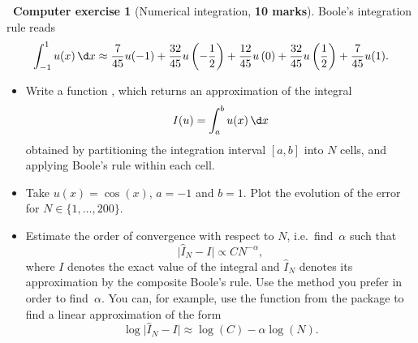 \documentclass[10pt]{article}
\theoremstyle{definition}
\newtheorem{compexercise}{{\normalfont \faLaptop}~Computer exercise}
\theoremstyle{remark}
\begin{document}
\begin{compexercise}
    [Numerical integration, \textbf{10 marks}]
    Boole's integration rule reads
    \[
        \int_{-1}^{1} u(x) \, \d x
        \approx \frac{7}{45} u(-1) + \frac{32}{45} u\left(-\frac{1}{2}\right) + \frac{12}{45} u\left(0\right) + \frac{32}{45} u\left(\frac{1}{2}\right) + \frac{7}{45} u(1).
    \]
    \begin{itemize}
        \item
            Write a function ,
            which returns an approximation of the integral
            \[
                I(u) = \int_{a}^{b} u(x) \, \d x
            \]
            obtained by partitioning the integration interval $[a, b]$ into $N$ cells,
            and applying Boole's rule within each cell.

        \item
            Take $u(x) = \cos(x)$, $a = -1$ and $b = 1$.
            Plot the evolution of the error for $N \in \{1, \dotsc, 200\}$.

        \item
            Estimate the order of convergence with respect to $N$, i.e.\ find~$\alpha$ such that
            \[
                \lvert \widehat I_{N} - I \rvert \propto C N^{-\alpha},
            \]
            where $I$ denotes the exact value of the integral
            and $\widehat I_{N}$ denotes its approximation by the composite Boole's rule.
            Use the method you prefer in order to find~$\alpha$.
            You can, for example, 
            use the function  from the  package to find a linear approximation
            of the form
            \[
                \log \lvert \widehat I_{N} - I \rvert \approx \log (C) - \alpha \log(N).
            \]
    \end{itemize}
\end{compexercise}
\end{document}
